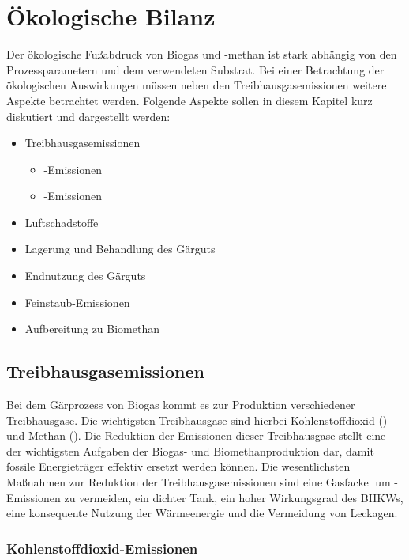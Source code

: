 \section{Ökologische Bilanz}

Der ökologische Fußabdruck von Biogas und -methan ist stark abhängig von den Prozessparametern und dem verwendeten Substrat. Bei einer Betrachtung der ökologischen Auswirkungen müssen neben den Treibhausgasemissionen weitere Aspekte betrachtet werden. Folgende Aspekte sollen in diesem Kapitel kurz diskutiert und dargestellt werden:

\begin{itemize}
	\item Treibhausgasemissionen
	\begin{itemize}
		\item {}-Emissionen
		\item {}-Emissionen
	\end{itemize}
	\item Luftschadstoffe
	\item Lagerung und Behandlung des Gärguts
	\item Endnutzung des Gärguts
	\item Feinstaub-Emissionen
	\item Aufbereitung zu Biomethan
\end{itemize}


\subsection{Treibhausgasemissionen}

Bei dem Gärprozess von Biogas kommt es zur Produktion verschiedener Treibhausgase. Die wichtigsten Treibhausgase sind hierbei Kohlenstoffdioxid () und Methan (). Die Reduktion der Emissionen dieser Treibhausgase stellt eine der wichtigsten Aufgaben der Biogas- und Biomethanproduktion dar, damit fossile Energieträger effektiv ersetzt werden können. Die wesentlichsten Maßnahmen zur Reduktion der Treibhausgasemissionen sind eine Gasfackel um -Emissionen zu vermeiden, ein dichter Tank, ein hoher Wirkungsgrad des \glspl{BHKW}, eine konsequente Nutzung der Wärmeenergie und die Vermeidung von Leckagen. \parencite{Paolini2018}


\subsubsection{Kohlenstoffdioxid-Emissionen}

